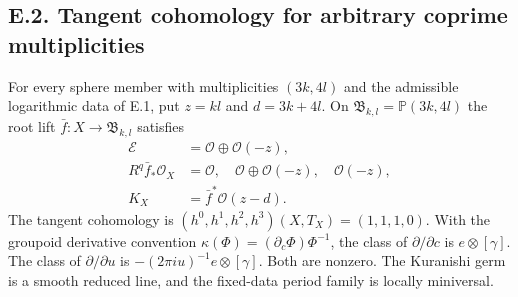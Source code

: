 \subsection{E.2. Tangent cohomology for arbitrary coprime multiplicities}
\begin{theorem}\label{push:src:E.2.1}
For every sphere member with multiplicities $(3k,4l)$ and the
admissible logarithmic data of E.1, put $z=kl$ and $d=3k+4l$.
On $\mathfrak B_{k,l}=\mathbb P(3k,4l)$ the root lift
$\bar f:X\to\mathfrak B_{k,l}$ satisfies
\[
 \begin{split}
 \mathcal E&=\mathcal O\oplus\mathcal O(-z),\\
 R^q\bar f_*\mathcal O_X&=
 \mathcal O,\quad\mathcal O\oplus\mathcal O(-z),\quad\mathcal O(-z),\\
 K_X&=\bar f^*\mathcal O(z-d).
 \end{split}
\]
The tangent cohomology is $(h^0,h^1,h^2,h^3)(X,T_X)=(1,1,1,0)$.
With the groupoid derivative convention
$\kappa(\Phi)=(\partial_c\Phi)\Phi^{-1}$, the class of
$\partial/\partial c$ is $e\otimes[\gamma]$.  The class of
$\partial/\partial u$ is
$-(2\pi i u)^{-1}e\otimes[\gamma]$.  Both are nonzero.
The Kuranishi germ is a smooth reduced line, and the fixed-data
period family is locally miniversal.
\end{theorem}
